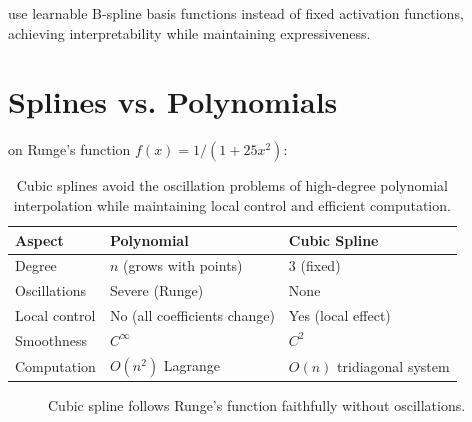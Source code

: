  use learnable B-spline basis functions instead of fixed activation functions, achieving interpretability while maintaining expressiveness.




\newpage
\section{Splines vs. Polynomials}

 on Runge's function $f(x) = 1/(1+25x^2)$:

\begin{table}[ht]
\centering
\begin{tabular}{p{}p{}p{}}
\toprule
\textbf{Aspect} & \textbf{Polynomial} & \textbf{Cubic Spline} \\
\midrule
Degree & $n$ (grows with points) & 3 (fixed) \\
Oscillations & Severe (Runge) & None \\
Local control & No (all coefficients change) & Yes (local effect) \\
Smoothness & $C^\infty$ & $C^2$ \\
Computation & $O(n^2)$ Lagrange & $O(n)$ tridiagonal system \\
\bottomrule
\end{tabular}
\vspace{2em}
\caption{Cubic splines avoid the oscillation problems of high-degree polynomial interpolation while maintaining local control and efficient computation.}
\label{tab:splines_vs_polynomials}
\end{table}


\begin{figure}[h]
    \centering
    \caption{Cubic spline follows Runge's function faithfully without oscillations.}
    \label{fig:spline_vs_poly}
\end{figure}

